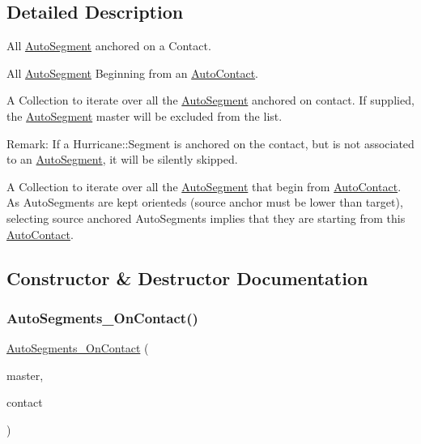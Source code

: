 \subsection{Detailed Description}
All \mbox{\hyperlink{classKatabatic_1_1AutoSegment}{Auto\+Segment}} anchored on a Contact. 

All \mbox{\hyperlink{classKatabatic_1_1AutoSegment}{Auto\+Segment}} Beginning from an \mbox{\hyperlink{classKatabatic_1_1AutoContact}{Auto\+Contact}}.

A Collection to iterate over all the \mbox{\hyperlink{classKatabatic_1_1AutoSegment}{Auto\+Segment}} anchored on {\ttfamily contact}. If supplied, the \mbox{\hyperlink{classKatabatic_1_1AutoSegment}{Auto\+Segment}} {\ttfamily master} will be excluded from the list.

\begin{DoxyParagraph}{Remark\+: If a Hurricane\+:\+:Segment is anchored on the {\ttfamily contact}, but is not}
associated to an \mbox{\hyperlink{classKatabatic_1_1AutoSegment}{Auto\+Segment}}, it will be silently skipped.
\end{DoxyParagraph}
A Collection to iterate over all the \mbox{\hyperlink{classKatabatic_1_1AutoSegment}{Auto\+Segment}} that begin from \mbox{\hyperlink{classKatabatic_1_1AutoContact}{Auto\+Contact}}. As Auto\+Segments are kept orienteds (source anchor must be lower than target), selecting source anchored Auto\+Segments implies that they are starting from this \mbox{\hyperlink{classKatabatic_1_1AutoContact}{Auto\+Contact}}. 

\subsection{Constructor \& Destructor Documentation}
\mbox{\label{classKatabatic_1_1AutoSegments__OnContact_af3f727d0c0fe394da508f52a6c9e4b90}} 
\subsubsection{\texorpdfstring{Auto\+Segments\+\_\+\+On\+Contact()}{AutoSegments\_OnContact()}\hspace{0.1cm}{\footnotesize\ttfamily [1/2]}}
{\footnotesize\ttfamily \mbox{\hyperlink{classKatabatic_1_1AutoSegments__OnContact}{Auto\+Segments\+\_\+\+On\+Contact}} (\begin{DoxyParamCaption}\item[{\mbox{\hyperlink{classKatabatic_1_1AutoSegment}{Auto\+Segment}} $\ast$}]{master,  }\item[{\textbf{ Contact} $\ast$}]{contact }\end{DoxyParamCaption})\hspace{0.3cm}{\ttfamily [inline]}}


